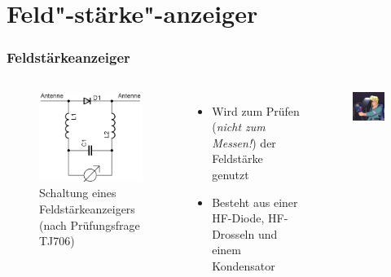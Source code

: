 \section*{Feld"-stärke"-anzeiger}
\begin{frame}
  \frametitle{Feldstärkeanzeiger}
  \begin{columns}
    \begin{center}
      \begin{figure}
        \includegraphics[width=\textwidth,height=.7\textheight,keepaspectratio]{a16/Feldstaerkeanzeiger.png}
        \caption{Schaltung eines Feldstärkeanzeigers (nach Prüfungsfrage TJ706)}
      \end{figure}
    \end{center}
    \begin{itemize}
      \item Wird zum Prüfen (\emph{nicht zum Messen!}) der Feldstärke genutzt
      \item Besteht aus einer HF-Diode, HF-Drosseln und einem Kondensator
    \end{itemize}
    \begin{flushright}
      \begin{figure}
        \includegraphics[width=.7\textwidth,height=.35\textheight,keepaspectratio]{a16/ghostbusters_egon.jpg}

\end{figure}
\end{flushright}
\end{columns}
\end{frame}
